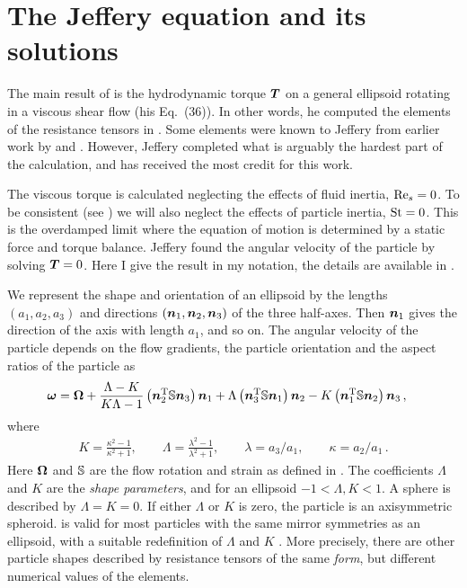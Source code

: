 \documentclass[thesis.tex]{subfiles}
\begin{document}
\section{The Jeffery equation and its solutions}

The main result of \citet{jeffery1922} is the hydrodynamic torque $\mbox{\boldmath$T$}$ on a general ellipsoid rotating in a viscous shear flow (his Eq.~(36)). In other words, he computed the elements of the resistance tensors in . Some elements were known to Jeffery from earlier work by \citet{oberbeck1876} and \citet{edwardes1893}. However, Jeffery completed what is arguably the hardest part of the calculation, and has received the most credit for this work.

The viscous torque is calculated neglecting the effects of fluid inertia, $\textrm{Re}_s=0$. To be consistent (see ) we will also neglect the effects of particle inertia, $\mbox{St}=0$. This is the overdamped limit where the equation of motion is determined by a static force and torque balance. Jeffery found the angular velocity of the particle by solving $\mbox{\boldmath$T$}=0$. Here I give the result in my notation, the details are available in .

We represent the shape and orientation of an ellipsoid by the lengths $(a_1, a_2, a_3)$ and directions $(\mbox{\boldmath$n$}_1, \mbox{\boldmath$n$}_2, \mbox{\boldmath$n$}_3)$ of the three half-axes. Then $\mbox{\boldmath$n$}_1$ gives the direction of the axis with length $a_1$, and so on. The angular velocity of the particle depends on the flow gradients, the particle orientation and the aspect ratios of the particle as \cite{jeffery1922}
\begin{align}
	\ve \omega &= \ve \Omega
	 + \frac{\Lambda-K}{K \Lambda - 1}\left(\ve n_2\transpose \ma S\ve n_3\right)\ve n_1
	 + \Lambda\left(\ve n_3\transpose \ma S\ve n_1\right)\ve n_2
	  - K\left(\ve n_1\transpose \ma S\ve n_2\right)\ve n_3\,,\eqnlab{triaxialomega}
\end{align}
where
\begin{align}
	K=\frac{\kappa^2-1}{\kappa^2+1}, \qquad \Lambda=\frac{\lambda^2-1}{\lambda^2+1},\qquad \lambda=a_3/a_1, \qquad \kappa=a_2/a_1\,.
\end{align}
Here $\mbox{\boldmath$\Omega$}$ and $\mathbb{S}$ are the flow rotation and strain as defined in . The coefficients $\Lambda$ and $K$ are the \emph{shape parameters}, and for an ellipsoid $-1 < \Lambda, K < 1$. A sphere is described by $\Lambda=K=0$. If either $\Lambda$ or $K$ is zero, the particle is an axisymmetric spheroid.  is valid for most particles with the same mirror symmetries as an ellipsoid, with a suitable redefinition of $\Lambda$ and $K$ \cite{bretherton1962,happel1965,kim1991}. More precisely, there are other particle shapes described by resistance tensors of the same \emph{form}, but different numerical values of the elements.
\end{document}
